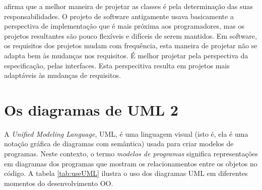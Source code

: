 \documentclass[
	11pt,				%
	openright,
	twoside,			%
	a4paper,			%
	english,			%
	french,
	brazil,				%
	sumario=tradicional
	]{abntex2}
\begin{document}
 afirma que a melhor maneira de projetar as classes é pela determinação das suas responsabilidades. O projeto de software antigamente usava basicamente a perspectiva de implementação que é mais próxima aos programadores, mas os projetos resultantes são pouco flexíveis e difíceis de serem mantidos. Em software, os requisitos dos projetos mudam com frequência, esta maneira de projetar não se adapta bem às mudanças nos requisitos. É melhor projetar pela perspectiva da especificação, pelas interfaces. Esta perspecitiva resulta em projetos mais adaptáveis às mudanças de requisitos.

\section{Os diagramas de UML 2}

A \textit{Unified Modeling Language}, UML, é uma linguagem visual (isto é, ela é uma notação gráfica de diagramas com semântica) usada para criar modelos de programas. Neste contexto, o termo \textit{modelos de programas} significa representações em diagramas dos programas que mostram os relacionamentos entre os objetos no código. A tabela \ref{tab:useUML} ilustra o uso dos diagramas UML em diferentes momentos do desenvolvimento OO.
\end{document}
